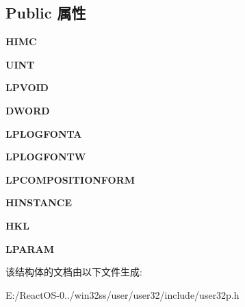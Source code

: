 \subsection*{Public 属性}
\begin{DoxyCompactItemize}
\item 
\mbox{\label{struct_imm32_api_table_a2648409931eaf2602665ab5eed068328}} 
{\bfseries H\+I\+MC}
\item 
\mbox{\label{struct_imm32_api_table_afad3306865e4f522ae15f2bf975d0f0c}} 
{\bfseries U\+I\+NT}
\item 
\mbox{\label{struct_imm32_api_table_aaac653c276d17d774d964b0c93c02c38}} 
{\bfseries L\+P\+V\+O\+ID}
\item 
\mbox{\label{struct_imm32_api_table_a968953eb4887c041d4147b4d03f79aa3}} 
{\bfseries D\+W\+O\+RD}
\item 
\mbox{\label{struct_imm32_api_table_a78e73a1ecee3fec8d7e2fe313715304e}} 
{\bfseries L\+P\+L\+O\+G\+F\+O\+N\+TA}
\item 
\mbox{\label{struct_imm32_api_table_a78654de7cfbe66670e59e5025b25c74b}} 
{\bfseries L\+P\+L\+O\+G\+F\+O\+N\+TW}
\item 
\mbox{\label{struct_imm32_api_table_a684f8d997a2b76e5bb2091d174276c76}} 
{\bfseries L\+P\+C\+O\+M\+P\+O\+S\+I\+T\+I\+O\+N\+F\+O\+RM}
\item 
\mbox{\label{struct_imm32_api_table_a61930126639eeaa8d9621aee76f07a14}} 
{\bfseries H\+I\+N\+S\+T\+A\+N\+CE}
\item 
\mbox{\label{struct_imm32_api_table_a9af84a859e83d344fc42f74c0db31de8}} 
{\bfseries H\+KL}
\item 
\mbox{\label{struct_imm32_api_table_a5ba297895affb4736c718477f02f434b}} 
{\bfseries L\+P\+A\+R\+AM}
\end{DoxyCompactItemize}


该结构体的文档由以下文件生成\+:\begin{DoxyCompactItemize}
\item 
E\+:/\+React\+O\+S-\/0../win32ss/user/user32/include/user32p.\+h\end{DoxyCompactItemize}
